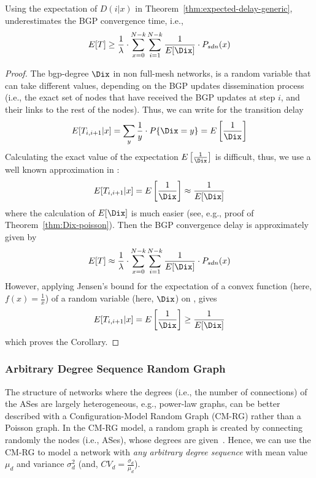\begin{corollary}
Using the expectation of $D(i|x)$ in Theorem~\ref{thm:expected-delay-generic}, underestimates the BGP convergence time, i.e.,
\begin{equation}
E[T] \geq \frac{1}{\lambda}\cdot \sum_{x=0}^{N-k}\sum_{i=1}^{N-k}\frac{1}{E[\Dix]}\cdot P_{sdn}(x)
\end{equation}
\end{corollary}
\begin{proof}
The bgp-degree $\Dix$ in non full-mesh networks, is a random variable that can take different values, depending on the BGP updates dissemination process (i.e., the exact set of nodes that have received the BGP updates at step $i$, and their links to the rest of the nodes). Thus, we can write for the transition delay 
\begin{equation}\label{eq:transition-delay-generic}
E[T_{i,i+1}|x] = \sum_{y} \frac{1}{y} \cdot P\{\Dix = y\} = E\left[\frac{1}{\Dix}\right]
\end{equation}
Calculating the exact value of the expectation $E\left[\frac{1}{\Dix}\right]$ is difficult, thus, we use a well known approximation in :
\begin{equation}
E[T_{i,i+1}|x] = E\left[\frac{1}{\Dix}\right] \approx \frac{1}{E[\Dix]}
\end{equation}
where the calculation of $E[\Dix]$ is much easier (see, e.g., proof of Theorem~\ref{thm:Dix-poisson}). Then the BGP convergence delay is approximately given by
\begin{equation}
E[T] \approx \frac{1}{\lambda}\cdot \sum_{x=0}^{N-k}\sum_{i=1}^{N-k}\frac{1}{E[\Dix]}\cdot P_{sdn}(x)
\end{equation}
However, applying Jensen's bound for the expectation of a convex function (here, $f(x) = \frac{1}{x}$) of a random variable (here, $\Dix$) on , gives
\begin{equation}
E[T_{i,i+1}|x] = E\left[\frac{1}{\Dix}\right] \geq \frac{1}{E[\Dix]}
\end{equation}
which proves the Corollary.
\end{proof}

\subsubsection{Arbitrary Degree Sequence Random Graph}
The structure of networks where the degrees (i.e., the number of connections) of the ASes are largely heterogeneous, e.g., power-law graphs, can be better described with a Configuration-Model Random Graph (CM-RG) rather than a Poisson graph. In the CM-RG model, a random graph is created by connecting randomly the nodes (i.e., ASes), whose degrees are given~\cite{Newman:Networks-book}. Hence, we can use the CM-RG to model a network with \textit{any arbitrary degree sequence} with mean value $\mu_{d}$ and variance $\sigma_{d}^{2}$ (and, $CV_{d} = \frac{\sigma_{d}}{\mu_{d}}$).

